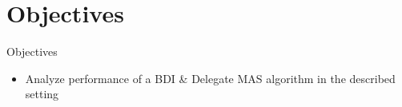 \section{Objectives}


\begin{frame}{Objectives}
    \begin{itemize}
        \item Analyze performance of a BDI \& Delegate MAS algorithm in the described setting
    \end{itemize}
\end{frame}

